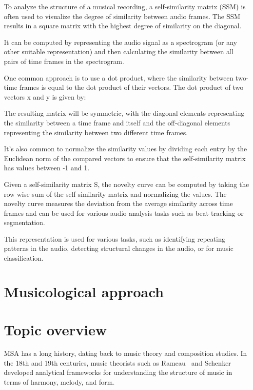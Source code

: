 To analyze the structure of a musical recording, a self-similarity matrix (SSM) is often used to visualize the degree of similarity between audio frames. The SSM results in a square matrix with the highest degree of similarity on the diagonal.

It can be computed by representing the audio signal as a spectrogram (or any other suitable representation) and then calculating the similarity between all pairs of time frames in the spectrogram.

One common approach is to use a dot product, where the similarity between two-time frames is equal to the dot product of their vectors. The dot product of two vectors x and y is given by:



The resulting matrix will be symmetric, with the diagonal elements representing the similarity between a time frame and itself and the off-diagonal elements representing the similarity between two different time frames.

It's also common to normalize the similarity values by dividing each entry by the Euclidean norm of the compared vectors to ensure that the self-similarity matrix has values between -1 and 1.

Given a self-similarity matrix S, the novelty curve can be computed by taking the row-wise sum of the self-similarity matrix and normalizing the values. The novelty curve measures the deviation from the average similarity across time frames and can be used for various audio analysis tasks such as beat tracking or segmentation.



This representation is used for various tasks, such as identifying repeating patterns in the audio, detecting structural changes in the audio, or for music classification.

\section{Musicological approach}
\section{Topic overview}

MSA has a long history, dating back to music theory and composition studies. In the 18th and 19th centuries, music theorists such as Rameau~\cite{christensen2004rameau} and Schenker~\cite{schenkerdocumentsonline} developed analytical frameworks for understanding the structure of music in terms of harmony, melody, and form.

